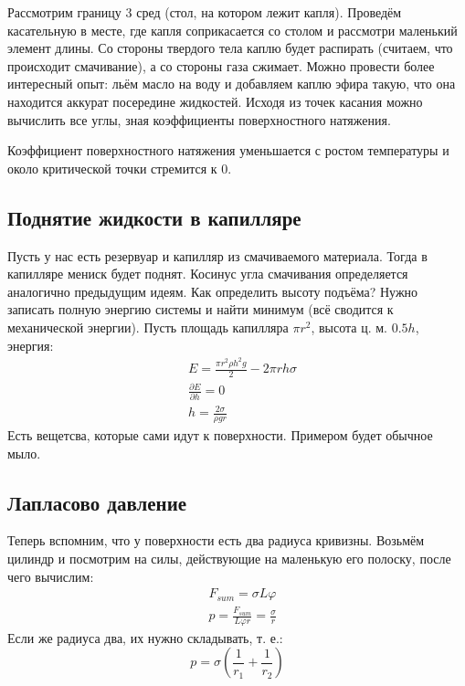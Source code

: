 \documentclass[a4paper, 12pt]{article}
\renewcommand{\phi}{\varphi} %
\begin{document}
	Рассмотрим границу 3 сред (стол, на котором лежит капля). Проведём касательную в месте, где капля соприкасается со столом и рассмотри маленький элемент длины. Со стороны твердого тела каплю будет распирать (считаем, что происходит смачивание), а со стороны газа сжимает. Можно провести более интересный опыт: льём масло на воду и добавляем каплю эфира такую, что она находится аккурат посередине жидкостей. Исходя из точек касания можно вычислить все углы, зная коэффициенты поверхностного натяжения. 
	
	Коэффициент поверхностного натяжения уменьшается с ростом температуры и около критической точки стремится к 0.
	\subsection{Поднятие жидкости в капилляре}
	Пусть у нас есть резервуар и капилляр из смачиваемого материала. Тогда в капилляре мениск будет поднят. Косинус угла смачивания определяется аналогично предыдущим идеям. Как определить высоту подъёма? Нужно записать полную энергию системы и найти минимум (всё сводится к механической энергии). Пусть площадь капилляра $\pi r^{2}$, высота ц. м. $0.5h$, энергия:
	\begin{equation*}
		\begin{aligned}
			& E = \frac{ \pi r^{2} \rho h^{2} g}{2} - 2 \pi r h \sigma \\
			& \frac{\partial E}{\partial h} = 0                        \\
			& h =\frac {2 \sigma}{\rho g r}                            
		\end{aligned}
	\end{equation*}
	Есть вещетсва, которые сами идут к поверхности. Примером будет обычное мыло. 
	\subsection{Лапласово давление}
	Теперь вспомним, что у поверхности есть два радиуса кривизны. Возьмём цилиндр и посмотрим на силы, действующие на маленькую его полоску, после чего вычислим:
	\begin{equation*}
		\begin{aligned}
			& F_{sum} = \sigma L \phi                           \\
			& p =\frac{ F_{sum} }{ L \phi r} = \frac{\sigma}{r} 
		\end{aligned}
	\end{equation*}
	Если же радиуса два, их нужно складывать, т. е.:
	\begin{equation*}
		p =\sigma( \frac{1}{r_{1}}+ \frac{1}{r_{2}})
	\end{equation*}
\end{document}
